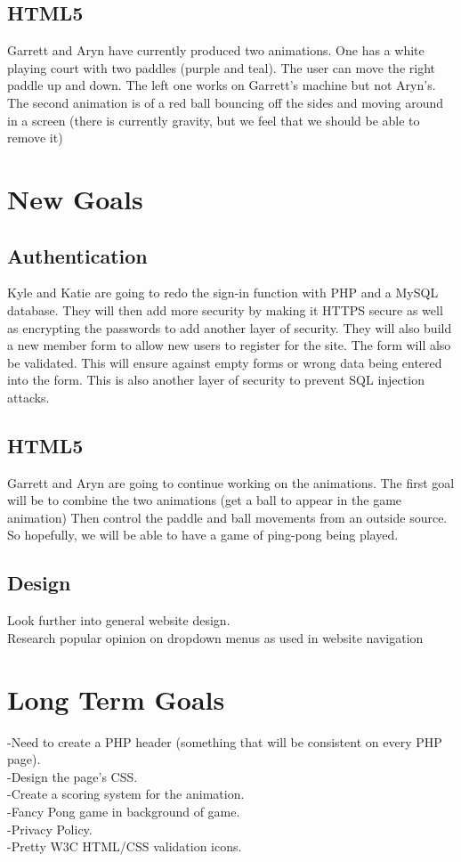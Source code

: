 	\subsection{HTML5}
	Garrett and Aryn have currently produced two animations. One has a white playing court with two paddles (purple and teal). The user can move the right paddle up and down. The left one works on Garrett's machine but not Aryn's. The second animation is of a red ball bouncing off the sides and moving around in a screen (there is currently gravity, but we feel that we should be able to remove it)

\section{New Goals}
	\subsection{Authentication}
	Kyle and Katie are going to redo the sign-in function with PHP and a MySQL database. They will then add more security  by making it HTTPS secure as well as encrypting the passwords to add another layer of security. They will also build a new member form to allow new users to register for the site. The form will also be validated. This will ensure against empty forms or wrong data being entered into the form. This is also another layer of security to prevent SQL injection attacks.
	\subsection{HTML5}
	Garrett and Aryn are going to continue working on the animations. The first goal will be to combine the two animations (get a ball to appear in the game animation) Then control the paddle and ball movements from an outside source. So hopefully, we will be able to have a game of ping-pong being played.
	\subsection{Design}
	Look further into general website design.\\Research popular opinion on dropdown menus as used in website navigation
	
\section{Long Term Goals}
	-Need to create a PHP header (something that will be consistent on every PHP page).\\
	-Design the page's CSS.\\
	-Create a scoring system for the animation.\\
	-Fancy Pong game in background of game.\\
	-Privacy Policy.\\
	-Pretty W3C HTML/CSS validation icons.\\




